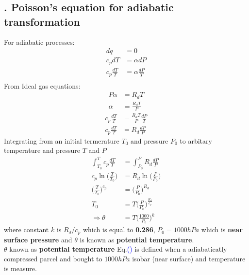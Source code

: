 \documentclass[fleqn,10pt]{SelfArx} %
\newcommand{\myeqref}[1]{\textcolor{blue}{\textup{(\getrefnumber{#1})}}}
\begin{document}
\subsection{. Poisson's equation for adiabatic transformation}
For adiabatic processes:
\begin{align}
    dq &= 0 \\
    c_p dT &= \alpha dP \\
    c_p \frac{dT}{T} &= \alpha \frac{dP}{T} \\
\end{align}
From Ideal gas equations:
\begin{align}
    P\alpha &= R_dT \\
    \alpha &= \frac{R_d T}{P}
\end{align}
\begin{align}
    c_p \frac{dT}{T} &= \frac{R_d T}{P} \frac{dP}{T} \\
    c_p \frac{dT}{T} &= R_d \frac{dP}{P}
\end{align}
Integrating from an initial termerature $T_0$ and pressure $P_0$ to arbitary temperature and pressure $T$ and $P$
\begin{align}
    \int^{T}_{T_0} c_p \frac{dT}{T} &= \int^{P}_{P_0} R_d \frac{dP}{P} \\
    c_p \ln\Big(\frac{T}{T_0}\Big) &= R_d  \ln\Big(\frac{P}{P_0}\Big) \\
    \Big(\frac{T}{T_0}\Big)^{c_p} &= \Big(\frac{P}{P_0}\Big)^{R_d} \\
    T_0 &= T\Big(\frac{P}{P_0}\Big)^{\frac{R_d}{c_p}} \\
    \Rightarrow \theta &= T\Big(\frac{1000}{P_0}\Big)^{k} \label{eq:poissonsEq}
\end{align}
where constant $k$ is $R_d/c_p$ which is equal to \textbf{0.286}, $P_0 = 1000 hPa$ which is \textbf{near surface pressure} and $\theta$ is known as \textbf{potential temperature}. \\
$\theta$ known as \textbf{potential temperature} Eq.\myeqref{eq:poissonsEq} is defined when a adiabaticatly compressed parcel and bought to $1000hPa$ isobar (near surface) and temperature is measure. \\

\newpage
{}
\end{document}
